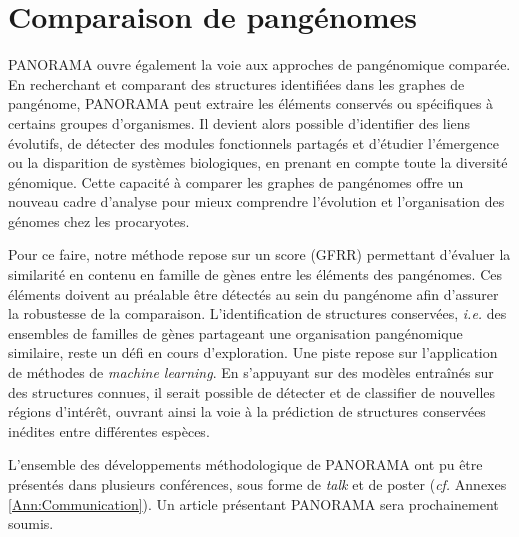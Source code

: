 \section{Comparaison de pangénomes}

PANORAMA ouvre également la voie aux approches de pangénomique comparée. En recherchant et comparant des structures identifiées dans les graphes de pangénome, PANORAMA peut extraire les éléments conservés ou spécifiques à certains groupes d’organismes. Il devient alors possible d’identifier des liens évolutifs, de détecter des modules fonctionnels partagés et d’étudier l’émergence ou la disparition de systèmes biologiques, en prenant en compte toute la diversité génomique. Cette capacité à comparer les graphes de pangénomes offre un nouveau cadre d’analyse pour mieux comprendre l’évolution et l’organisation des génomes chez les procaryotes.

Pour ce faire, notre méthode repose sur un score (GFRR) permettant d’évaluer la similarité en contenu en famille de gènes entre les éléments des pangénomes. Ces éléments doivent au préalable être détectés au sein du pangénome afin d’assurer la robustesse de la comparaison. L’identification de structures conservées, \textit{i.e.} des ensembles de familles de gènes partageant une organisation pangénomique similaire, reste un défi en cours d’exploration. Une piste repose sur l’application de méthodes de \textit{machine learning}. En s’appuyant sur des modèles entraînés sur des structures connues, il serait possible de détecter et de classifier de nouvelles régions d’intérêt, ouvrant ainsi la voie à la prédiction de structures conservées inédites entre différentes espèces.


L'ensemble des développements méthodologique de PANORAMA ont pu être présentés dans plusieurs conférences, sous forme de \textit{talk} et de poster (\textit{cf.} Annexes \ref{Ann:Communication}). Un article présentant PANORAMA sera prochainement soumis.